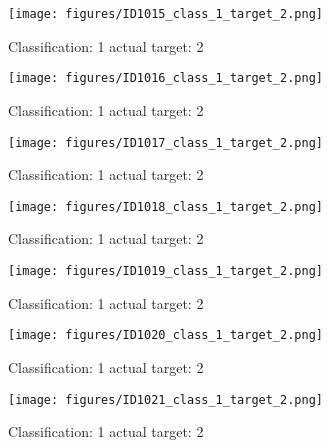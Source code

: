 \begin{figure}[h!]
\begin{center}
\texttt{[image: figures/ID1015\_class\_1\_target\_2.png]}
\end{center}
\caption{ Classification: 1 actual target: 2}
\label{fig:ID1015_class_1_target_2}
\end{figure}
\begin{figure}[h!]
\begin{center}
\texttt{[image: figures/ID1016\_class\_1\_target\_2.png]}
\end{center}
\caption{ Classification: 1 actual target: 2}
\label{fig:ID1016_class_1_target_2}
\end{figure}
\begin{figure}[h!]
\begin{center}
\texttt{[image: figures/ID1017\_class\_1\_target\_2.png]}
\end{center}
\caption{ Classification: 1 actual target: 2}
\label{fig:ID1017_class_1_target_2}
\end{figure}
\begin{figure}[h!]
\begin{center}
\texttt{[image: figures/ID1018\_class\_1\_target\_2.png]}
\end{center}
\caption{ Classification: 1 actual target: 2}
\label{fig:ID1018_class_1_target_2}
\end{figure}
\begin{figure}[h!]
\begin{center}
\texttt{[image: figures/ID1019\_class\_1\_target\_2.png]}
\end{center}
\caption{ Classification: 1 actual target: 2}
\label{fig:ID1019_class_1_target_2}
\end{figure}
\begin{figure}[h!]
\begin{center}
\texttt{[image: figures/ID1020\_class\_1\_target\_2.png]}
\end{center}
\caption{ Classification: 1 actual target: 2}
\label{fig:ID1020_class_1_target_2}
\end{figure}
\begin{figure}[h!]
\begin{center}
\texttt{[image: figures/ID1021\_class\_1\_target\_2.png]}
\end{center}
\caption{ Classification: 1 actual target: 2}
\label{fig:ID1021_class_1_target_2}
\end{figure}
